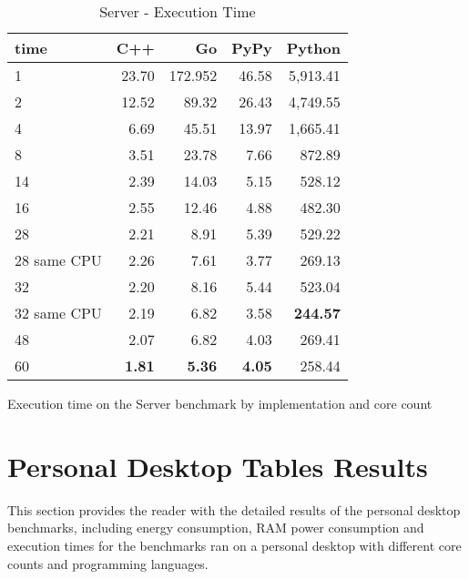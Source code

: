 \begin{table}[H]
    \centering
    \begin{tabular}{lrrrr}
        \hline
        time         & C++             & Go            & PyPy          & Python     \\
        \hline
        1            & 23.70           & 172.952       & 46.58         & 5,913.41        \\
        2            & 12.52           & 89.32         & 26.43         & 4,749.55        \\
        4            & 6.69            & 45.51         & 13.97         & 1,665.41        \\
        8	           & 3.51  	         & 23.78 	       & 7.66          & 872.89          \\
        14           & 2.39            & 14.03         & 5.15          & 528.12          \\
        16           & 2.55            & 12.46         & 4.88          & 482.30          \\
        28           & 2.21            & 8.91          & 5.39          & 529.22          \\
        28 same CPU  & 2.26            & 7.61          & 3.77          & 269.13          \\
        32           & 2.20            & 8.16          & 5.44          & 523.04          \\
        32 same CPU  & 2.19            & 6.82          & 3.58          & \textbf{244.57} \\
        48           & 2.07            & 6.82          & 4.03          & 269.41          \\
        60           & \textbf{1.81}   & \textbf{5.36} & \textbf{4.05} & 258.44          \\
        \hline
    \end{tabular}
\caption{Server - Execution Time}{Execution time on the Server benchmark by implementation and core count}
\label{tab:server-execution-time}
\end{table}

\chapter{Personal Desktop Tables Results}

This section provides the reader with the detailed results of the personal desktop benchmarks, including energy consumption, RAM power consumption and execution times for the benchmarks ran on a personal desktop with different core counts and programming languages.

